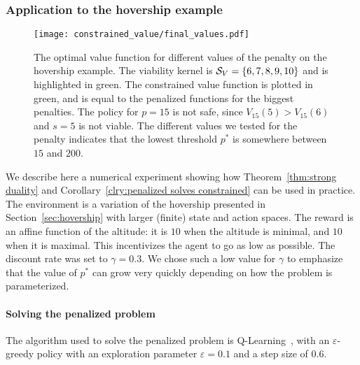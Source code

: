 \subsubsection{Application to the hovership example} \label{sec:hovership example}

\begin{figure}[t]
	\centering
	\texttt{[image: constrained\_value/final\_values.pdf]}
	\caption[Penalized optimal value function]{The optimal value function for different values of the penalty on the hovership example. The viability kernel is ${\mathcal{S}_{V}}=\{6, 7, 8, 9, 10\}$ and is highlighted in green. The constrained value function is plotted in green, and is equal to the penalized functions for the biggest penalties. The policy for $p=15$ is not safe, since $V_{15}(5) > V_{15}(6)$ and $s=5$ is not viable. The different values we tested for the penalty indicates that the lowest threshold $p^*$ is somewhere between $15$ and $200$.}
	\label{fig:hovership values comparison}
\end{figure}
We describe here a numerical experiment showing how Theorem~\ref{thm:strong duality} and Corollary~\ref{clry:penalized solves constrained} can be used in practice. The environment is a variation of the hovership presented in Section~\ref{sec:hovership} with larger (finite) state and action spaces. The reward is an affine function of the altitude: it is $10$ when the altitude is minimal, and $10$ when it is maximal. This incentivizes the agent to go as low as possible. The discount rate was set to $\gamma = 0.3$. We chose such a low value for $\gamma$ to emphasize that the value of $p^*$ can grow very quickly depending on how the problem is parameterized.

\paragraph{Solving the penalized problem} The algorithm used to solve the penalized problem is Q-Learning~\cite{watkins1992q}, with an $\varepsilon$-greedy policy with an exploration parameter $\varepsilon = 0.1$ and a step size of $0.6$.

